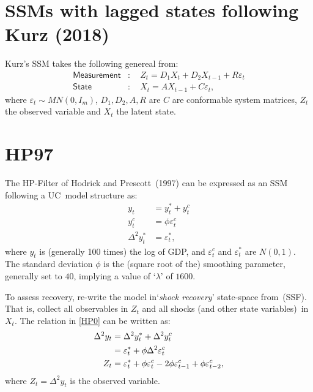 \documentclass[a4paper,12pt]{article}
\newcommand{\bsq}{\begin{subequations}}\newcommand{\esq}{\end{subequations}}
\begin{document}
\section{SSMs with lagged states following Kurz (2018)\ }

Kurz's SSM takes the following genereal from:\bsq\label{SSM}%
\begin{align}
\mathsf{Measurement}& :\quad Z_{t}=D_{1}X_{t}+D_{2}X_{t-1}+R\varepsilon _{t}
\label{ssm1} \\
\mathsf{State}& :\quad X_{t}=AX_{t-1}+C\varepsilon _{t},  \label{ssm2}
\end{align}%
\esq where $\varepsilon _{t}\sim MN(0,I_{m})$, $D_{1},D_{2},A,R$ are $C$ are
conformable system matrices, $Z_{t}$ the observed variable and $X_{t}$ the
latent state.

\section{HP97}

The HP-Filter of Hodrick and Prescott\ (1997) can be expressed as an SSM
following a UC\ model structure as:\bsq\label{HP0}%
\begin{align}
y_{t}& =y_{t}^{\ast }+y_{t}^{c}  \label{HP0a} \\
y_{t}^{c}& =\phi \varepsilon _{t}^{c}  \label{HP0b} \\
\Delta ^{2}y_{t}^{\ast }& =\varepsilon _{t}^{\ast },  \label{HP0c}
\end{align}%
\esq where $y_{t}$ is (generally 100 times) the log of GDP, and $\varepsilon
_{t}^{c}$ and $\varepsilon _{t}^{\ast }$ are $N(0,1)$. The standard
deviation $\phi $ is the (square root of the) smoothing parameter, generally
set to $40$, implying a value of `$\lambda $' of $1600$.

To assess recovery, re-write the model in`\emph{shock recovery}' state-space
from\ (SSF). That is, collect all observables in $Z_{t}$ and all shocks (and
other state variables)\ in $X_{t}$. The relation in \ref{HP0} can be written
as:%
\begin{align}
\Delta ^{2}y_{t}& =\Delta ^{2}y_{t}^{\ast }+\Delta ^{2}y_{t}^{c}  \notag \\
& =\varepsilon _{t}^{\ast }+\phi \Delta ^{2}\varepsilon _{t}^{c}  \notag \\
Z_{t}& =\varepsilon _{t}^{\ast }+\phi \varepsilon _{t}^{c}-2\phi \varepsilon
_{t-1}^{c}+\phi \varepsilon _{t-2}^{c},  \label{Z}
\end{align}%
where $Z_{t}=\Delta ^{2}y_{t}$ is the observed variable.
\end{document}
